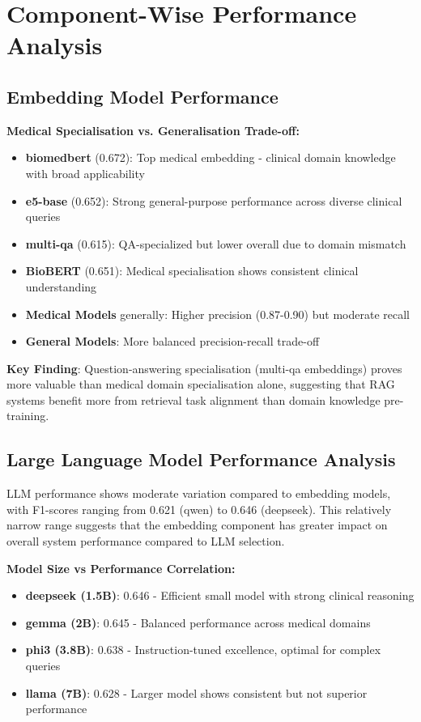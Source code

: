 \section{Component-Wise Performance Analysis}

\subsection{Embedding Model Performance}


\textbf{Medical Specialisation vs. Generalisation Trade-off:}
\begin{itemize}
    \item \textbf{biomedbert} (0.672): Top medical embedding - clinical domain knowledge with broad applicability
    \item \textbf{e5-base} (0.652): Strong general-purpose performance across diverse clinical queries
    \item \textbf{multi-qa} (0.615): QA-specialized but lower overall due to domain mismatch
    \item \textbf{BioBERT} (0.651): Medical specialisation shows consistent clinical understanding
    \item \textbf{Medical Models} generally: Higher precision (0.87-0.90) but moderate recall
    \item \textbf{General Models}: More balanced precision-recall trade-off
\end{itemize}

\textbf{Key Finding}: Question-answering specialisation (multi-qa embeddings) proves more valuable than medical domain specialisation alone, suggesting that RAG systems benefit more from retrieval task alignment than domain knowledge pre-training.

\subsection{Large Language Model Performance Analysis}

LLM performance shows moderate variation compared to embedding models, with F1-scores ranging from 0.621 (qwen) to 0.646 (deepseek). This relatively narrow range suggests that the embedding component has greater impact on overall system performance compared to LLM selection.

\textbf{Model Size vs Performance Correlation:}
\begin{itemize}
    \item \textbf{deepseek (1.5B)}: 0.646 - Efficient small model with strong clinical reasoning
    \item \textbf{gemma (2B)}: 0.645 - Balanced performance across medical domains
    \item \textbf{phi3 (3.8B)}: 0.638 - Instruction-tuned excellence, optimal for complex queries
    \item \textbf{llama (7B)}: 0.628 - Larger model shows consistent but not superior performance
\end{itemize}


